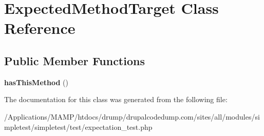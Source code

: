 \hypertarget{class_expected_method_target}{
\section{ExpectedMethodTarget Class Reference}
\label{class_expected_method_target}
}
\subsection*{Public Member Functions}
\begin{DoxyCompactItemize}
\item 
\hypertarget{class_expected_method_target_a4a07fe73d1ed0c087990c1bc4672c40d}{
{\bfseries hasThisMethod} ()}
\label{class_expected_method_target_a4a07fe73d1ed0c087990c1bc4672c40d}

\end{DoxyCompactItemize}


The documentation for this class was generated from the following file:\begin{DoxyCompactItemize}
\item 
/Applications/MAMP/htdocs/drump/drupalcodedump.com/sites/all/modules/simpletest/simpletest/test/expectation\_\-test.php\end{DoxyCompactItemize}
